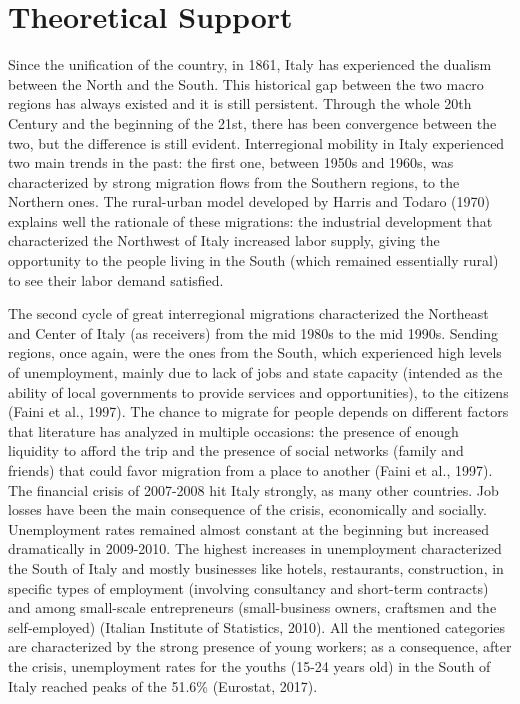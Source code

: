 \documentclass{article}
\theoremstyle{definition}
\theoremstyle{remark}
\begin{document}
\section{Theoretical Support}
Since the unification of the country, in 1861, Italy has experienced the dualism between the North and the South. This historical gap between the two macro regions has always existed and it is still persistent. Through the whole 20th Century and the beginning of the 21st, there has been convergence between the two, but the difference is still evident. Interregional mobility in Italy experienced two main trends in the past: the first one, between 1950s and 1960s, was characterized by strong migration flows from the Southern regions, to the Northern ones. The rural-urban model developed by Harris and Todaro (1970) explains well the rationale of these migrations: the industrial development that characterized the Northwest of Italy increased labor supply, giving the opportunity to the people living in the South (which remained essentially rural) to see their labor demand satisfied.

The second cycle of great interregional migrations characterized the Northeast and Center of Italy (as receivers) from the mid 1980s to the mid 1990s. Sending regions, once again, were the ones from the South, which experienced high levels of unemployment, mainly due to lack of jobs and state capacity (intended as the ability of local governments to provide services and opportunities), to the citizens (Faini et al., 1997). 
The chance to migrate for people depends on different factors that literature has analyzed in multiple occasions: the presence of enough liquidity to afford the trip and the presence of social networks (family and friends) that could favor migration from a place to another (Faini et al., 1997).
The financial crisis of 2007-2008 hit Italy strongly, as many other countries. Job losses have been the main consequence of the crisis, economically and socially. Unemployment rates remained almost constant at the beginning but increased dramatically in 2009-2010. The highest increases in unemployment characterized the South of Italy and mostly businesses like hotels, restaurants, construction,  in specific types of employment (involving consultancy and short-term contracts) and among small-scale entrepreneurs (small-business owners, craftsmen and the self-employed) (Italian Institute of Statistics, 2010). All the mentioned categories are characterized by the strong presence of young workers; as a consequence, after the crisis, unemployment rates for the youths (15-24 years old) in the South of Italy reached peaks of the 51.6\% (Eurostat, 2017). 
\end{document}
